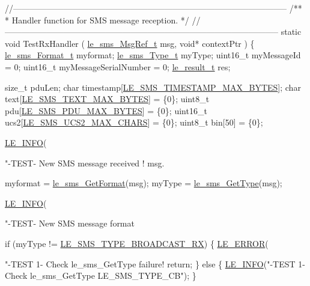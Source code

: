 \begin{DoxyCodeInclude}
{{{{\textcolor{comment}{//--------------------------------------------------------------------------------------------------}\textcolor{comment}{}
\textcolor{comment}{/**}
\textcolor{comment}{ * Handler function for SMS message reception.}
\textcolor{comment}{ */}
\textcolor{comment}{//--------------------------------------------------------------------------------------------------}
\textcolor{keyword}{static} \textcolor{keywordtype}{void} TestRxHandler
(
    \hyperlink{le__sms__interface_8h_a8eb2a15362fe26516fc68fd7a7d5e3e7}{le\_sms\_MsgRef\_t} msg,
    \textcolor{keywordtype}{void}* contextPtr
)
\{
    \hyperlink{le__sms__interface_8h_a337778c44e63660c44fa2116699296c0}{le\_sms\_Format\_t}       myformat;
    \hyperlink{le__sms__interface_8h_a9001c5bc939bda5d5865e363bdf7662c}{le\_sms\_Type\_t}         myType;
    uint16\_t              myMessageId = 0;
    uint16\_t              myMessageSerialNumber = 0;
    \hyperlink{le__basics_8h_a1cca095ed6ebab24b57a636382a6c86c}{le\_result\_t}           res;

    \textcolor{keywordtype}{size\_t}                pduLen;
    \textcolor{keywordtype}{char}                  timestamp[\hyperlink{le__sms__interface_8h_a9844280f515fbc2b393844e63aa83075}{LE\_SMS\_TIMESTAMP\_MAX\_BYTES}];
    \textcolor{keywordtype}{char}                  text[\hyperlink{le__sms__interface_8h_a0dc5c2cec7c1fb166c47393fbb07e43f}{LE\_SMS\_TEXT\_MAX\_BYTES}] = \{0\};
    uint8\_t               pdu[\hyperlink{le__sms__interface_8h_aaa740f36bbc6d13d0b355d3dc2d8d4dc}{LE\_SMS\_PDU\_MAX\_BYTES}] = \{0\};
    uint16\_t              ucs2[\hyperlink{le__sms__interface_8h_a8026a1caf6d8b759972785ebefafaf94}{LE\_SMS\_UCS2\_MAX\_CHARS}] = \{0\};
    uint8\_t               bin[50] = \{0\};

    \hyperlink{le__log_8h_a23e6d206faa64f612045d688cdde5808}{LE\_INFO}(\textcolor{stringliteral}{"-TEST- New SMS message received ! msg.%

    myformat = \hyperlink{le__sms__interface_8h_a5c2b8ce7043b4732c7b0ede7c5d7118c}{le\_sms\_GetFormat}(msg);
    myType = \hyperlink{le__sms__interface_8h_a2a63c6b5179025a80fb86c7f188e1eb7}{le\_sms\_GetType}(msg);

    \hyperlink{le__log_8h_a23e6d206faa64f612045d688cdde5808}{LE\_INFO}(\textcolor{stringliteral}{"-TEST- New SMS message format %

    \textcolor{keywordflow}{if} (myType != \hyperlink{le__sms__interface_8h_a9001c5bc939bda5d5865e363bdf7662ca3dff7628faf85524d772f34f52699a47}{LE\_SMS\_TYPE\_BROADCAST\_RX})
    \{
        \hyperlink{le__log_8h_a353590f91b3143a7ba3a416ae5a50c3d}{LE\_ERROR}(\textcolor{stringliteral}{"-TEST  1- Check le\_sms\_GetType failure! %
        \textcolor{keywordflow}{return};
    \}
    \textcolor{keywordflow}{else}
    \{
        \hyperlink{le__log_8h_a23e6d206faa64f612045d688cdde5808}{LE\_INFO}(\textcolor{stringliteral}{"-TEST  1- Check le\_sms\_GetType LE\_SMS\_TYPE\_CB"});
    \}

}}}}}}}
\end{DoxyCodeInclude}
